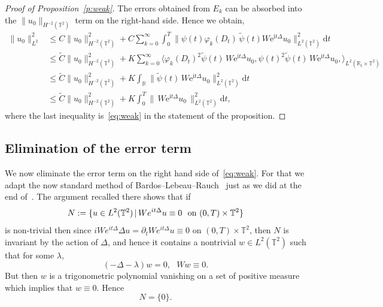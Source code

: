 \documentclass[10pt]{amsart}
\theoremstyle{definition}\newtheorem{defi}[theo]{Definition}\newtheorem{rema}[theo]{Remark}\newtheorem{exam}[theo]{Example}\newtheorem{exem}[theo]{Example}\newtheorem{nota}[theo]{Notation}
\newcommand{\R}{{\mathbb R}}
\newcommand{\TT}{{\mathbb T}}
\newcommand*{\dd}{\mathrm{d}}
\newcommand*{\dt}{\dd t}
\newcommand*{\tq}{\,|\,}
\begin{document}
\begin{proof}[Proof of Proposition~\ref{p:weak}]
The errors obtained from $ E_k $ can be absorbed into the $
\| u_0 \|_{ H^{-2} (\TT^2) } $ term on the right-hand side. Hence we obtain,
\begin{align*}
\|u_0 \|^2_{L^2} &\leq C \|u_0 \|_{H^{-2} (\TT^2)} ^2+ C \sum_{k=0}^\infty \int_{0}^T
\| \psi (t) \varphi_{k}(D_t)\, \widetilde \psi (t) W \mathrm{e}^{ \mathrm{i}t \Delta }u_0 \|^2_{L^2(\TT^2)} \dt\\
& \leq\widetilde C \|u_0 \|_{H^{-2} (\TT^2)} ^2+ K \sum_{k=0}^\infty
\langle \varphi_{k}(D_t)^2 \widetilde \psi (t) \, W \mathrm{e}^{\mathrm{i}t \Delta }u_0, \psi(t)^2 \widetilde \psi(t)\, W \mathrm{e}^{\mathrm{i}t \Delta}u_0, \rangle_{L^2 (\R_t \times \TT^2)} \\
& \leq \widetilde C \|u_0 \|_{H^{-2} (\TT^2)} ^2 + K \int_\R \| \widetilde \psi (t) \, W \mathrm{e}^{\mathrm{i}t \Delta} u_0\|^2_{L^2(\TT^2)} \dt \\
& \leq \widetilde C \|u_0 \|_{H^{-2} (\TT^2)} ^2 + K \int_{0}^T \|\, W\mathrm{e}^{\mathrm{i}t \Delta } u_0\, \|^2_{L^2(\TT^2)} \dt,
\end{align*}
where the last inequality is~\eqref{eq:weak} in the statement of the proposition.
\end{proof}

\subsection{Elimination of the error term}\label{eli}

We now eliminate the error term on the right hand side of~\eqref{eq:weak}. For that we adapt the now standard method of Bardos--Lebeau--Rauch~\cite{BLR} just as we did at the end of~\cite[Section~4]{BZ4}. The argument recalled there shows that if
\begin{equation}\label{eq:defN0}
N := \{ u \in L^2 (\TT^2) \tq W e^{ i t \Delta } u \equiv 0
\ \text{ on $ (0, T) \times \TT^2 $}\}
\end{equation}
is non-trivial then since $ iW e^{it\Delta } \Delta u= \partial_t W e^{ i t \Delta } u \equiv 0$ on $ (0, T) \times \TT^2 $, then $N$ is invariant by the action of $\Delta$, and hence it contains a nontrivial $ w \in L^2 (\TT^2) $ such that for some $ \lambda $,
\[
(- \Delta - \lambda) w = 0, \ \ \ W w \equiv 0.
\]
But then $ w $ is a trigonometric polynomial vanishing on a set of positive measure which implies that $ w \equiv 0 $. Hence
\begin{equation}\label{eq:N0}
N = \{ 0 \}.
\end{equation}
\end{document}
